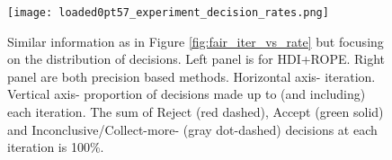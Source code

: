 

\begin{figure}[h!]
  \centering
  \texttt{[image: loaded0pt57\_experiment\_decision\_rates.png]}
  \caption{Similar information as in Figure \ref{fig:fair_iter_vs_rate} but focusing on
  the distribution of decisions. Left panel is for HDI+ROPE. Right panel are both
  precision based methods. Horizontal axis- iteration. Vertical axis- proportion of
  decisions made up to (and including) each iteration. The sum of Reject (red dashed),
  Accept (green solid) and Inconclusive/Collect-more- (gray dot-dashed) decisions at
  each iteration is 100\%.
  }
  \label{fig:loaded0pt57_decisions}
\end{figure}